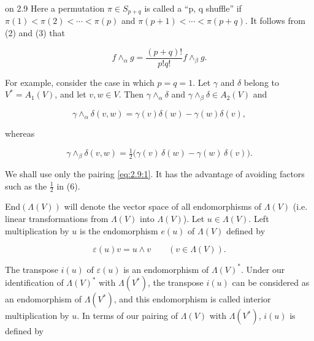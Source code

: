 \begin{remarks}{on 2.9}
Here a permutation  $ \pi \in S_{p+q} $ is called a ``p, q shuffle'' if  $ \pi(1) < \pi(2) < \cdots < \pi(p) $ and  $ \pi(p+1) < \cdots < \pi(p+q) $. It follows from (2) and (3) that

\begin{equation}
\tag{4}\label{eq:2.10:4}
f\wedge_{\alpha}g=\frac{(p+q)!}{p!q!}f\wedge_{\beta}g.
\end{equation}

For example, consider the case in which $p = q = 1$. Let $\gamma$ and $\delta$ belong to $V^* = A_1(V)$, and let $v, w \in V$. Then $\gamma \wedge_\alpha \delta$ and $\gamma \wedge_\beta \delta \in A_2(V)$ and

\begin{equation}
\tag{5}\label{eq:2.10:5}
\gamma\wedge_{\alpha}\delta(v,w)=\gamma(v)\delta(w)-\gamma(w)\delta(v),
\end{equation}

whereas

\begin{equation}
\tag{6}\label{eq:2.10:6}
\gamma\wedge_{\beta}\delta\left(v,w\right)=\tfrac{1}{2}\big(\gamma(v)\,\delta(w)-\gamma(w)\,\delta(v)\big).
\end{equation}

We shall use only the pairing \eqref{eq:2.9:1}. It has the advantage of avoiding factors such as the $\frac{1}{2}$ in (6).

\end{remarks}

\label{thm:2.11}
End$(\Lambda(V))$ will denote the vector space of all endomorphisms of $\Lambda(V)$ (i.e. linear transformations from $\Lambda(V)$ into $\Lambda(V)$). Let $u \in \Lambda(V)$. Left multiplication by $u$ is the endomorphism $e(u)$ of $\Lambda(V)$ defined by 

\begin{equation}
\tag{1}\label{eq:2.11:1}
\varepsilon(u)v=u\land v\qquad(v\in\Lambda(V)).
\end{equation}

The transpose $i(u)$ of $\varepsilon(u)$ is an endomorphism of $\Lambda(V)^{*}$. Under our identification of $\Lambda(V)^{*}$ with $\Lambda(V^{*})$, the transpose $i(u)$ can be considered as an endomorphism of $\Lambda(V^{*})$, and this endomorphism is called interior multiplication by $u$. In terms of our pairing of $\Lambda(V)$ with $\Lambda(V^{*})$, $i(u)$ is defined by 

